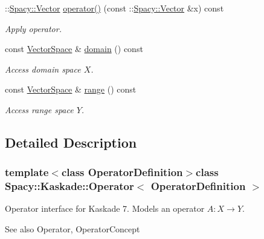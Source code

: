 \begin{DoxyCompactItemize}
\-::\hyperlink{classSpacy_1_1Vector}{\-Spacy\-::\-Vector} \hyperlink{classSpacy_1_1Kaskade_1_1Operator_a598da59e26cce77e41619ba554db5eb4}{operator()} (const \-::\hyperlink{classSpacy_1_1Vector}{\-Spacy\-::\-Vector} \&x) const 
\begin{DoxyCompactList}\small\item\em \-Apply operator. \end{DoxyCompactList}\item 
\hypertarget{classSpacy_1_1OperatorBase_a2588f9b3e0188820c4c494e63293dc6f}{const \hyperlink{classSpacy_1_1VectorSpace}{\-Vector\-Space} \& \hyperlink{classSpacy_1_1OperatorBase_a2588f9b3e0188820c4c494e63293dc6f}{domain} () const }\label{classSpacy_1_1OperatorBase_a2588f9b3e0188820c4c494e63293dc6f}

\begin{DoxyCompactList}\small\item\em \-Access domain space $X$. \end{DoxyCompactList}\item 
\hypertarget{classSpacy_1_1OperatorBase_ab19d3b7a6f290b1079248f1e567e53d6}{const \hyperlink{classSpacy_1_1VectorSpace}{\-Vector\-Space} \& \hyperlink{classSpacy_1_1OperatorBase_ab19d3b7a6f290b1079248f1e567e53d6}{range} () const }\label{classSpacy_1_1OperatorBase_ab19d3b7a6f290b1079248f1e567e53d6}

\begin{DoxyCompactList}\small\item\em \-Access range space $Y$. \end{DoxyCompactList}\end{DoxyCompactItemize}


\subsection{\-Detailed \-Description}
\subsubsection*{template$<$class \-Operator\-Definition$>$class Spacy\-::\-Kaskade\-::\-Operator$<$ Operator\-Definition $>$}

\-Operator interface for \-Kaskade 7. \-Models an operator $A:X\rightarrow Y$. 

\begin{DoxySeeAlso}{\-See also}
\-Operator, \-Operator\-Concept 
\end{DoxySeeAlso}



